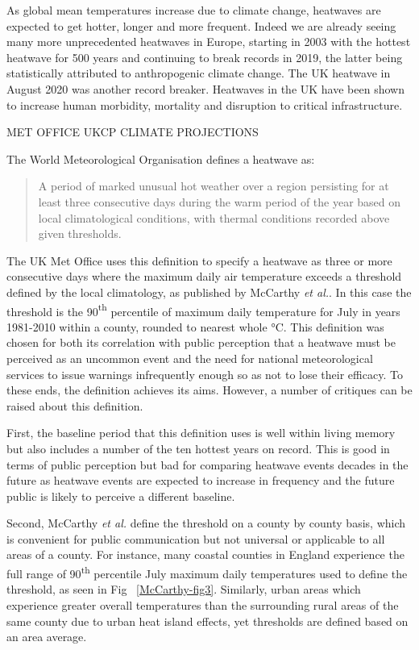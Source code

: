\documentclass[10pt,letterpaper]{article}
\begin{document}
As global mean temperatures increase due to climate change, heatwaves are expected to get hotter, longer and more frequent. 
Indeed we are already seeing many more unprecedented heatwaves in Europe, starting in 2003 with the hottest heatwave for 500 years\cite{Stott2004} and continuing to break records in 2019, the latter being statistically attributed to anthropogenic climate change.\cite{Vautard2020} 
The UK heatwave in August 2020 was another record breaker.\cite{Askew2020}
Heatwaves in the UK have been shown to increase human morbidity\cite{Smith2016}, mortality\cite{Johnson2004} and disruption to critical infrastructure.\cite{Dawson2016}

MET OFFICE UKCP CLIMATE PROJECTIONS

The World Meteorological Organisation defines a heatwave as\cite{WMO2018}:
\begin{quote}
    A period of marked unusual hot weather over a region persisting for at least three consecutive days during the warm period of the year based on local climatological conditions, with thermal conditions recorded above given thresholds.
\end{quote}
The UK Met Office uses this definition to specify a heatwave as three or more consecutive days where the maximum daily air temperature exceeds a threshold defined by the local climatology, as published by McCarthy \textit{et al.}.\cite{McCarthy2019}
In this case the threshold is the 90{\textsuperscript{th}} percentile of maximum daily temperature for July in years 1981-2010 within a county, rounded to nearest whole °C.
This definition was chosen for both its correlation with public perception that a heatwave must be perceived as an uncommon event and the need for national meteorological services to issue warnings infrequently enough so as not to lose their efficacy.
To these ends, the definition achieves its aims.
However, a number of critiques can be raised about this definition.

First, the baseline period that this definition uses is well within living memory but also includes a number of the ten hottest years on record.\cite{McCarthy2019}
This is good in terms of public perception but bad for comparing heatwave events decades in the future as heatwave events are expected to increase in frequency and the future public is likely to perceive a different baseline.

Second, McCarthy \textit{et al.} define the threshold on a county by county basis, which is convenient for public communication but not universal or applicable to all areas of a county.
For instance, many coastal counties in England experience the full range of 90\textsuperscript{th} percentile July maximum daily temperatures used to define the threshold, as seen in Fig ~\ref{McCarthy-fig3}.\cite{McCarthy2019}
Similarly, urban areas which experience greater overall temperatures than the surrounding rural areas of the same county due to urban heat island effects, yet thresholds are defined based on an area average.
\end{document}
